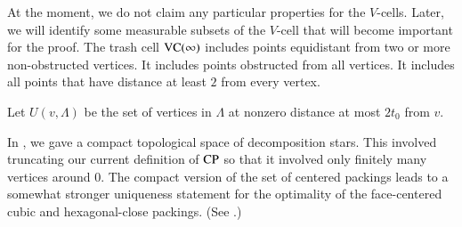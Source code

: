 \begin{remark}\label{remark:pathology}
At the moment, we do not claim any particular properties for the
$V$-cells.  Later, we will identify some measurable subsets of the
$V$-cell that will become important for the proof.  The trash cell
${\operatorname{VC}}(\infty)$ includes points equidistant from two or more
non-obstructed vertices.  It includes points obstructed from all
vertices.  It includes all points that have distance at least $2$
from every vertex.
\end{remark}


\label{sec:indexing} \label{sec:compact}

\begin{definition}\label{def:U}
Let $U(v,\Lambda)$
be the set of vertices in $\Lambda$ at nonzero distance at most
$2t_0$ from $v$.  
\end{definition}


\begin{remark} In \cite{DCG}, we gave a compact topological
space of decomposition stars.  This involved truncating our current
definition of ${\operatorname{CP}}$ so that it involved only finitely many
vertices around $0$.  The compact version of the set of centered
packings leads to a somewhat stronger uniqueness statement for the
optimality of the face-centered cubic and hexagonal-close
packings.  (See \cite{DCG}.)
\end{remark}









%

